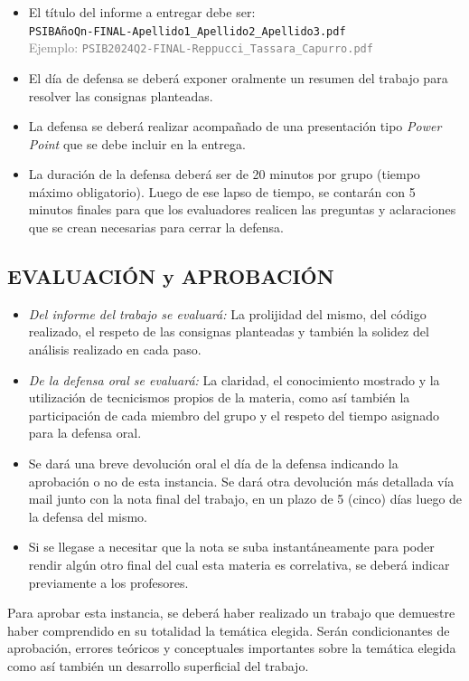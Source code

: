 \documentclass[10pt]{article}
\begin{document}
\begin{itemize}
    \item El título del informe a entregar debe ser:\\  \texttt{PSIBAñoQn-FINAL-Apellido1\_Apellido2\_Apellido3.pdf} \\ 
    \textcolor{gray}{Ejemplo: \texttt{PSIB2024Q2-FINAL-Reppucci\_Tassara\_Capurro.pdf}}

    \item El día de defensa se deberá exponer oralmente un resumen del trabajo para resolver las consignas planteadas.

    \item La defensa se deberá realizar acompañado de una presentación tipo \textit{Power Point} que se debe incluir en la entrega.

    \item La duración de la defensa deberá ser de 20 minutos por grupo (tiempo máximo obligatorio). Luego de ese lapso de tiempo, se contarán con 5 minutos finales para que los evaluadores realicen las preguntas y aclaraciones que se crean necesarias para cerrar la defensa.
    

\end{itemize}

\vspace{0.25cm}

\subsection*{EVALUACIÓN y APROBACIÓN}

\begin{itemize} 
    \item \textit{Del informe del trabajo se evaluará:} La prolijidad del mismo, del código realizado, el respeto de las consignas planteadas y también la solidez del análisis realizado en cada paso.
    
    \item \textit{De la defensa oral se evaluará:} La claridad, el conocimiento mostrado y la utilización de tecnicismos propios de la materia, como así también la participación de cada miembro del grupo y el respeto del tiempo asignado para la defensa oral.

    \item Se dará una breve devolución oral el día de la defensa indicando la aprobación o no de esta instancia. Se dará otra devolución más detallada vía mail junto con la nota final del trabajo, en un plazo de 5 (cinco) días luego de la defensa del mismo.

    \item Si se llegase a  necesitar que la nota se suba instantáneamente para poder rendir algún otro final del cual esta materia es correlativa, se deberá indicar previamente a los profesores.
\end{itemize}

Para aprobar esta instancia, se deberá haber realizado un trabajo que demuestre haber comprendido en su totalidad la temática elegida. Serán condicionantes de aprobación, errores teóricos y conceptuales importantes sobre la temática elegida como así también un desarrollo superficial del trabajo.

\vspace{0.25cm}
\end{document}
